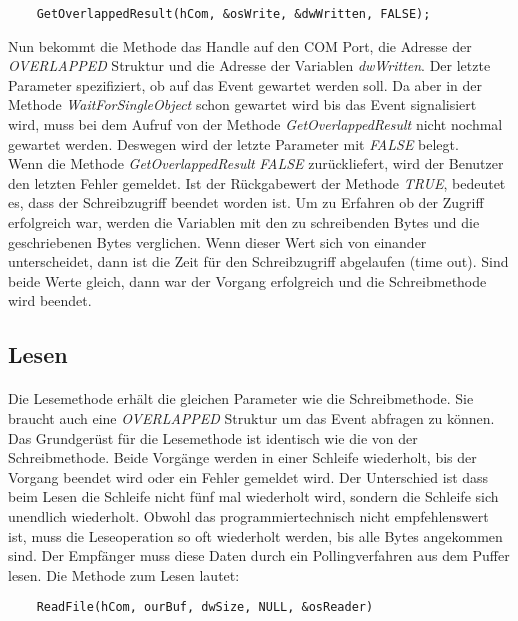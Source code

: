 \begin{lstlisting}
	GetOverlappedResult(hCom, &osWrite, &dwWritten, FALSE);
\end{lstlisting}

Nun bekommt die Methode das Handle auf den COM Port, die Adresse der \textit{OVERLAPPED} Struktur und die Adresse der Variablen \textit{dwWritten}. Der letzte Parameter spezifiziert, ob auf das Event gewartet werden soll. Da aber in der Methode \textit{WaitForSingleObject} schon gewartet wird bis das Event signalisiert wird, muss bei dem Aufruf von der Methode \textit{GetOverlappedResult} nicht nochmal gewartet werden. Deswegen wird der letzte Parameter mit \textit{FALSE} belegt.\\

Wenn die Methode \textit{GetOverlappedResult} \textit{FALSE} zurückliefert, wird der Benutzer den letzten Fehler gemeldet. Ist der Rückgabewert der Methode \textit{TRUE}, bedeutet es, dass der Schreibzugriff beendet worden ist. Um zu Erfahren ob der Zugriff erfolgreich war, werden die Variablen mit den zu schreibenden Bytes und die geschriebenen Bytes verglichen. Wenn dieser Wert sich von einander unterscheidet, dann ist die Zeit für den Schreibzugriff abgelaufen (time out). Sind beide Werte gleich, dann war der Vorgang erfolgreich und die Schreibmethode wird beendet.


\subsection{Lesen}
\paragraph{}
Die Lesemethode erhält die gleichen Parameter wie die Schreibmethode. Sie braucht auch eine \textit{OVERLAPPED} Struktur um das Event abfragen zu können. Das Grundgerüst für die Lesemethode ist identisch wie die von der Schreibmethode. Beide Vorgänge werden in einer Schleife wiederholt, bis der Vorgang beendet wird oder ein Fehler gemeldet wird. Der Unterschied ist dass beim Lesen die Schleife nicht fünf mal wiederholt wird, sondern die Schleife sich unendlich wiederholt. Obwohl das programmiertechnisch nicht empfehlenswert ist, muss die Leseoperation so oft wiederholt werden, bis alle Bytes angekommen sind. Der Empfänger muss diese Daten durch ein Pollingverfahren aus dem Puffer lesen. Die Methode zum Lesen lautet:

\begin{lstlisting}
	ReadFile(hCom, ourBuf, dwSize, NULL, &osReader)
\end{lstlisting}

